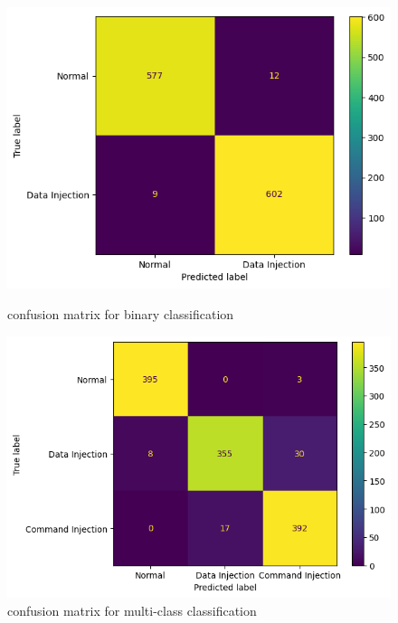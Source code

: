 \documentclass[12pt]{article}
\begin{document}
        \begin{figure}[h]
            \centering

            \begin{minipage}{.4\linewidth}
                \includegraphics[width = \linewidth]{figures/binary-cm}
                \caption{confusion matrix for binary classification}
                \label{fig:cm-part-a}
            \end{minipage}%
            \hfill
            \begin{minipage}{.4\linewidth}
                \includegraphics[width = \linewidth]{figures/multi-cm}
                \caption{confusion matrix for multi-class classification}
                \label{fig:cm-part-b}
            \end{minipage}

        \end{figure}
\end{document}
